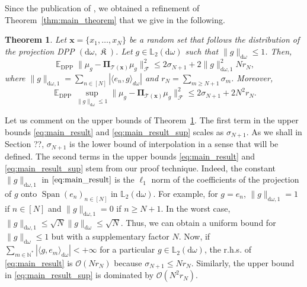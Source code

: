 \documentclass[twoside,11pt]{book}
\newtheorem{theorem}{Theorem}
\numberwithin{theorem}{chapter}
\numberwithin{definition}{chapter}
\numberwithin{proposition}{chapter}
\numberwithin{corollary}{chapter}
\numberwithin{example}{chapter}
\numberwithin{lemma}{chapter}
\DeclareMathOperator{\Span}{\mathrm{Span}}
\DeclareMathOperator{\DPP}{\mathrm{DPP}}
\DeclareMathOperator{\EX}{\mathbb{E}}
\DeclareMathOperator*{\KDPP}{\mathfrak{K}}
\begin{document}
Since the publication of \citep{BeBaCh19}, we obtained a refinement of Theorem~\ref{thm:main_theorem} that we give in the following.


\begin{theorem}\label{thm:main_theorem_improved}
Let $\bm{x} = \{x_{1}, \dots , x_{N}\}$ be a random set that follows the distribution of the projection DPP $(\mathrm{d}\omega, \KDPP )$. Let $g \in \mathbb{L}_{2}(\mathrm{d}\omega)$ such that $\|g\|_{\mathrm{d}\omega} \leq 1$. Then, 
\begin{equation}\label{eq:main_result}
\EX_{\DPP} \|\mu_{g} - \bm{\Pi}_{\mathcal{T}(\bm{x})} \mu_{g}\|_{\mathcal{F}}^{2}  \leq
2\sigma_{N+1} +2\|g\|_{\mathrm{d}\omega,1}^{2} N r_{N} ,
\end{equation}
where $\displaystyle \|g\|_{\mathrm{d}\omega,1} = \sum\limits_{n \in [N]} |\langle e_{n},g \rangle_{d\omega}|$ and $r_{N} = \sum\limits_{m \geq N+1} \sigma_{m}$. Moreover, 
\begin{equation}\label{eq:main_result_sup}
\EX_{\DPP} \sup\limits_{\|g\|_{\mathrm{d}\omega} \leq 1} \|\mu_{g} - \bm{\Pi}_{\mathcal{T}(\bm{x})} \mu_{g}\|_{\mathcal{F}}^{2}  \leq
2\sigma_{N+1} +2N^{2} r_{N}.
\end{equation}
\end{theorem}

Let us comment on the upper bounds of Theorem~\ref{thm:main_theorem_improved}. The first term in the upper bounds \eqref{eq:main_result} and \eqref{eq:main_result_sup} scales as $\sigma_{N+1}$. As we shall in Section ??, $\sigma_{N+1}$ is the lower bound of interpolation in a sense that will be defined. The second terms in the upper bounds \eqref{eq:main_result} and \eqref{eq:main_result_sup} stem from our proof technique. Indeed, the constant $\|g\|_{\mathrm{d}\omega,1}$ in $\eqref{eq:main_result}$ is the $\ell_1$ norm of the coefficients of the projection of $g$ onto $\Span(e_{n})_{n \in [N]}$ in $\mathbb{L}_{2}(\mathrm{d}\omega)$. For example, for $g = e_{n}$, $\|g\|_{\mathrm{d}\omega,1} = 1$ if $n \in [N]$ and $\|g\|_{\mathrm{d}\omega,1} = 0$ if $n \geq N+1$. In the worst case, $\|g\|_{\mathrm{d}\omega,1} \leq \sqrt{N} \|g\|_{\mathrm{d}\omega} \leq \sqrt{N}$.
Thus, we can obtain a uniform bound for $\|g\|_{\mathrm{d}\omega}\leq 1$ but with a supplementary factor $N$. Now, if $\sum\limits_{m \in \mathbb{N}^{*}} |\langle g,e_{m} \rangle_{\mathrm{d}\omega}| < +\infty$ for a particular $g \in \mathbb{L}_{2}(\mathrm{d}\omega)$, the r.h.s. of \eqref{eq:main_result} is $\mathcal{O}(Nr_{N})$ because $\sigma_{N+1} \leq Nr_{N}$. Similarly, the upper bound in \eqref{eq:main_result_sup} is dominated by $\mathcal{O}(N^{2}r_{N})$.
\end{document}
